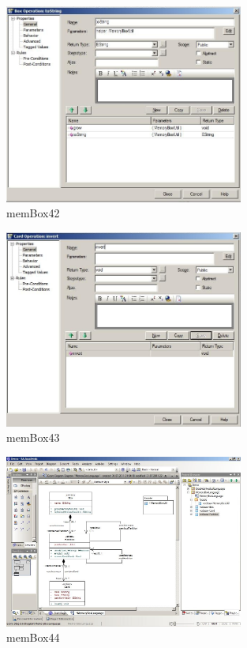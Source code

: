 \begin{figure}[!h]
	\centering
  \includegraphics[width=0.7\textwidth]{pics/memBox42.png}
	\caption{memBox42}
	\label{memBox42}
\end{figure}

\begin{figure}[!h]
	\centering
  \includegraphics[width=0.7\textwidth]{pics/memBox43.png}
	\caption{memBox43}
	\label{memBox43}
\end{figure}

\begin{figure}[!h]
	\centering
  \includegraphics[width=0.7\textwidth]{pics/memBox44.png}
	\caption{memBox44}
	\label{memBox44}
\end{figure}

